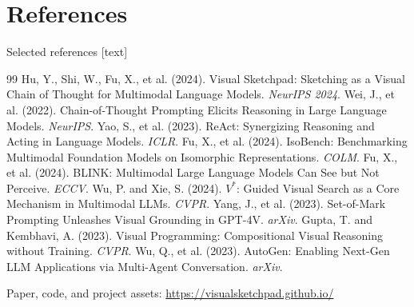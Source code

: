 \documentclass[10pt,aspectratio=169]{beamer}
\begin{document}
\section{References}
\begin{frame}{Selected references}
  [text]
  \scriptsize
  \setlength{\parskip}{0.16cm}
  \begin{thebibliography}{99}
     Hu, Y., Shi, W., Fu, X., et al. (2024).
      Visual Sketchpad: Sketching as a Visual Chain of Thought for Multimodal Language Models.
      \emph{NeurIPS 2024}.
     Wei, J., et al. (2022).
      Chain-of-Thought Prompting Elicits Reasoning in Large Language Models. \emph{NeurIPS}.
     Yao, S., et al. (2023).
      ReAct: Synergizing Reasoning and Acting in Language Models. \emph{ICLR}.
     Fu, X., et al. (2024).
      IsoBench: Benchmarking Multimodal Foundation Models on Isomorphic Representations. \emph{COLM}.
     Fu, X., et al. (2024).
      BLINK: Multimodal Large Language Models Can See but Not Perceive. \emph{ECCV}.
     Wu, P. and Xie, S. (2024).
      $V^*$: Guided Visual Search as a Core Mechanism in Multimodal LLMs. \emph{CVPR}.
     Yang, J., et al. (2023).
      Set-of-Mark Prompting Unleashes Visual Grounding in GPT-4V. \emph{arXiv}.
     Gupta, T. and Kembhavi, A. (2023).
      Visual Programming: Compositional Visual Reasoning without Training. \emph{CVPR}.
     Wu, Q., et al. (2023).
      AutoGen: Enabling Next-Gen LLM Applications via Multi-Agent Conversation. \emph{arXiv}.
  \end{thebibliography}
  \vfill
  {\color{Muted}\fontsize{6.8}{8}\selectfont
   Paper, code, and project assets: \url{https://visualsketchpad.github.io/}}
\end{frame}
\end{document}
